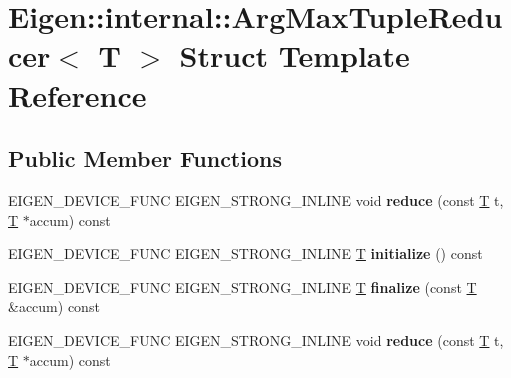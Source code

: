 \hypertarget{struct_eigen_1_1internal_1_1_arg_max_tuple_reducer}{}\section{Eigen\+:\+:internal\+:\+:Arg\+Max\+Tuple\+Reducer$<$ T $>$ Struct Template Reference}
\label{struct_eigen_1_1internal_1_1_arg_max_tuple_reducer}
\subsection*{Public Member Functions}
\begin{DoxyCompactItemize}
\item 
\mbox{\label{struct_eigen_1_1internal_1_1_arg_max_tuple_reducer_a2c3c4f0f5a6ff938b4791384ab0911f0}} 
E\+I\+G\+E\+N\+\_\+\+D\+E\+V\+I\+C\+E\+\_\+\+F\+U\+NC E\+I\+G\+E\+N\+\_\+\+S\+T\+R\+O\+N\+G\+\_\+\+I\+N\+L\+I\+NE void {\bfseries reduce} (const \hyperlink{group___sparse_core___module}{T} t, \hyperlink{group___sparse_core___module}{T} $\ast$accum) const
\item 
\mbox{\label{struct_eigen_1_1internal_1_1_arg_max_tuple_reducer_a0637b0519eae7a318cb992348cc13b79}} 
E\+I\+G\+E\+N\+\_\+\+D\+E\+V\+I\+C\+E\+\_\+\+F\+U\+NC E\+I\+G\+E\+N\+\_\+\+S\+T\+R\+O\+N\+G\+\_\+\+I\+N\+L\+I\+NE \hyperlink{group___sparse_core___module}{T} {\bfseries initialize} () const
\item 
\mbox{\label{struct_eigen_1_1internal_1_1_arg_max_tuple_reducer_a407ab409b07907ffd472dea343c4f490}} 
E\+I\+G\+E\+N\+\_\+\+D\+E\+V\+I\+C\+E\+\_\+\+F\+U\+NC E\+I\+G\+E\+N\+\_\+\+S\+T\+R\+O\+N\+G\+\_\+\+I\+N\+L\+I\+NE \hyperlink{group___sparse_core___module}{T} {\bfseries finalize} (const \hyperlink{group___sparse_core___module}{T} \&accum) const
\item 
\mbox{\label{struct_eigen_1_1internal_1_1_arg_max_tuple_reducer_a2c3c4f0f5a6ff938b4791384ab0911f0}} 
E\+I\+G\+E\+N\+\_\+\+D\+E\+V\+I\+C\+E\+\_\+\+F\+U\+NC E\+I\+G\+E\+N\+\_\+\+S\+T\+R\+O\+N\+G\+\_\+\+I\+N\+L\+I\+NE void {\bfseries reduce} (const \hyperlink{group___sparse_core___module}{T} t, \hyperlink{group___sparse_core___module}{T} $\ast$accum) const

\end{DoxyCompactItemize}
